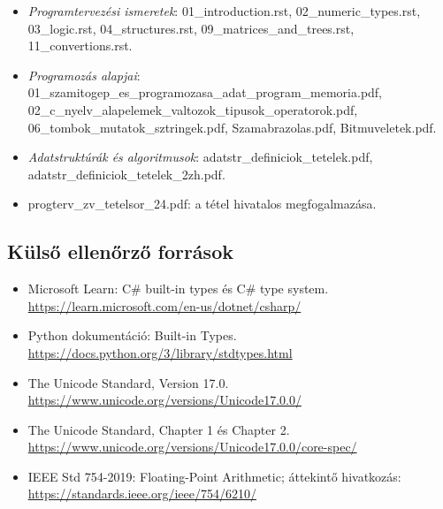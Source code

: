 \begin{itemize}
  \item \emph{Programtervezési ismeretek}: 01\_introduction.rst, 02\_numeric\_types.rst, 03\_logic.rst, 04\_structures.rst, 09\_matrices\_and\_trees.rst, 11\_convertions.rst.
  \item \emph{Programozás alapjai}: 01\_szamitogep\_es\_programozasa\_adat\_program\_memoria.pdf, 02\_c\_nyelv\_alapelemek\_valtozok\_tipusok\_operatorok.pdf, 06\_tombok\_mutatok\_sztringek.pdf, Szamabrazolas.pdf, Bitmuveletek.pdf.
  \item \emph{Adatstruktúrák és algoritmusok}: adatstr\_definiciok\_tetelek.pdf, adatstr\_definiciok\_tetelek\_2zh.pdf.
  \item progterv\_zv\_tetelsor\_24.pdf: a tétel hivatalos megfogalmazása.
\end{itemize}

\subsection*{Külső ellenőrző források}

\begin{itemize}
  \item Microsoft Learn: C\# built-in types és C\# type system. \url{https://learn.microsoft.com/en-us/dotnet/csharp/}
  \item Python dokumentáció: Built-in Types. \url{https://docs.python.org/3/library/stdtypes.html}
  \item The Unicode Standard, Version 17.0. \url{https://www.unicode.org/versions/Unicode17.0.0/}
  \item The Unicode Standard, Chapter 1 és Chapter 2. \url{https://www.unicode.org/versions/Unicode17.0.0/core-spec/}
  \item IEEE Std 754-2019: Floating-Point Arithmetic; áttekintő hivatkozás: \url{https://standards.ieee.org/ieee/754/6210/}
\end{itemize}

